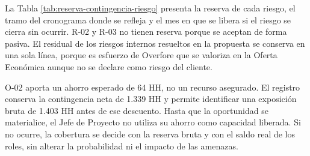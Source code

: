 \documentclass[anexo]{../../comun/overfore}
\begin{document}
La Tabla \ref{tab:reserva-contingencia-riesgo} presenta la reserva de cada riesgo, el tramo del cronograma donde se refleja y el mes en que se libera si el riesgo se cierra sin ocurrir. R-02 y R-03 no tienen reserva porque se aceptan de forma pasiva. El residual de los riesgos internos resueltos en la propuesta se conserva en una sola línea, porque es esfuerzo de Overfore que se valoriza en la Oferta Económica aunque no se declare como riesgo del cliente.

O-02 aporta un ahorro esperado de 64 HH, no un recurso asegurado. El registro conserva la contingencia neta de 1.339 HH y permite identificar una exposición bruta de 1.403 HH antes de ese descuento. Hasta que la oportunidad se materialice, el Jefe de Proyecto no utiliza su ahorro como capacidad liberada. Si no ocurre, la cobertura se decide con la reserva bruta y con el saldo real de los roles, sin alterar la probabilidad ni el impacto de las amenazas.
\end{document}
